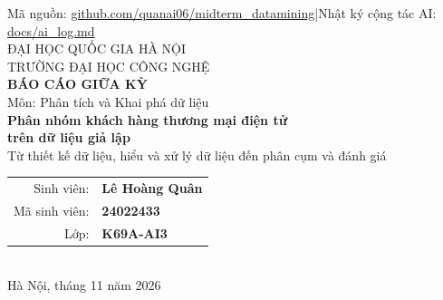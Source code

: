 \documentclass[11pt,a4paper]{article}
\newcommand{\CI}[2]{[#1; #2]}
\begin{document}
\begin{titlepage}
\centering
{\small Mã nguồn: \href{https://github.com/quanai06/midterm_datamining}{github.com/quanai06/midterm\_datamining}\quad|\quad Nhật ký cộng tác AI: \href{https://github.com/quanai06/midterm_datamining/blob/main/docs/ai_log.md}{docs/ai\_log.md}}\\[1.0cm]
{\large ĐẠI HỌC QUỐC GIA HÀ NỘI\\ TRƯỜNG ĐẠI HỌC CÔNG NGHỆ}\\[1.2cm]
{\Large \textbf{BÁO CÁO GIỮA KỲ}}\\[0.3cm]
{\large Môn: Phân tích và Khai phá dữ liệu}\\[1.8cm]
{\LARGE \textbf{Phân nhóm khách hàng thương mại điện tử\\[2pt] trên dữ liệu giả lập}}\\[0.6cm]
{\large Từ thiết kế dữ liệu, hiểu và xử lý dữ liệu đến phân cụm và đánh giá}\\[2.4cm]
\begin{tabular}{rl}
Sinh viên: & \textbf{Lê Hoàng Quân}\\
Mã sinh viên: & \textbf{24022433}\\
Lớp: & \textbf{K69A-AI3}\\
\end{tabular}\\[2.6cm]
{\normalsize Hà Nội, tháng 11 năm 2026}
\end{titlepage}

\begin{abstract}
\noindent Báo cáo xây dựng một quy trình khai phá dữ liệu hoàn chỉnh cho bài toán phân nhóm khách hàng thương mại điện tử (học không giám sát):
sinh dữ liệu giả lập có cấu trúc hành vi tiềm ẩn ($N=260$, 14 thuộc tính, nhiễu, 15 khách có ngoại lai, 3 cột thiếu giá trị), hiểu dữ liệu, tiền xử lý,
chuẩn bị dữ liệu và phân cụm. Dữ liệu trước xử lý và sau xử lý được so sánh bằng K-Means trên cùng 260 khách.
Với $k=4$, ARI so với phân khúc ẩn tăng từ $0{,}611$ \CI{0,515}{0,708} lên $0{,}745$ \CI{0,658}{0,833}; khi $k$ được chọn bằng Silhouette,
dữ liệu thô cho $k=7$ (ARI $0{,}434$) còn dữ liệu đã chuẩn bị chọn đúng $k=4$ (ARI $0{,}745$) và ổn định hơn rõ rệt.
Đóng góp riêng của bước chuẩn bị tại $k=4$ chưa chứng minh được ($+0{,}044$, khoảng tin cậy chứa 0); bằng chứng nằm ở việc chọn $k$ và độ ổn định.
Phân khúc ẩn chỉ dùng để đánh giá, không dùng để chọn tham số; các kết quả không thuận lợi được nêu cùng với kết quả.
\end{abstract}

\tableofcontents
\newpage








\appendix


\end{document}
